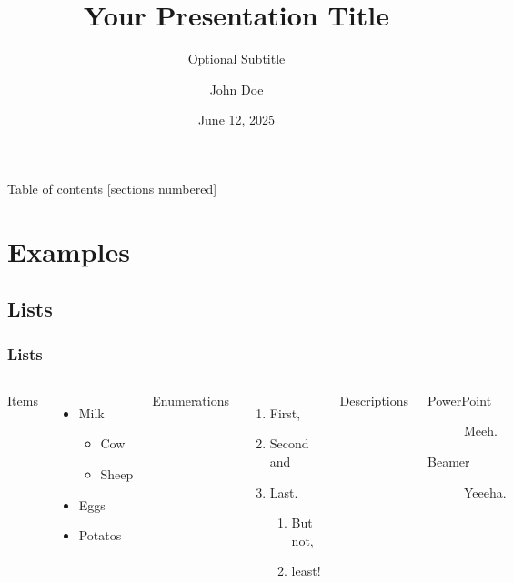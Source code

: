 \documentclass[11 pt,t,aspectratio=169]{beamer}
\title{Your Presentation Title}
\subtitle{Optional Subtitle}
\author{John Doe}
\institute{Advanced Computing and e-Science Group\\\url{https://advancedcomputing.ifca.es}}
\date{June 12, 2025}
\begin{document}
\maketitle

\begin{frame}[noframenumbering]{Table of contents}
    [sections numbered]
    \tableofcontents[hideallsubsections]
\end{frame}

\section{Examples}

\subsection{Lists}

\begin{frame}
    \frametitle{Lists}
    \begin{columns}[T,onlytextwidth]
        Items
        \begin{itemize}
            \item Milk
                \begin{itemize}
                    \item Cow
                    \item Sheep
                \end{itemize}
            \item Eggs
            \item Potatos
        \end{itemize}

        Enumerations
        \begin{enumerate}
            \item First,
            \item Second and
            \item Last.
                \begin{enumerate}
                    \item But not,
                    \item least!
                \end{enumerate}
        \end{enumerate}

        Descriptions
        \begin{description}
            \item[PowerPoint] Meeh.
            \item[Beamer] Yeeeha.
        \end{description}
    \end{columns}
\end{frame}
\end{document}
